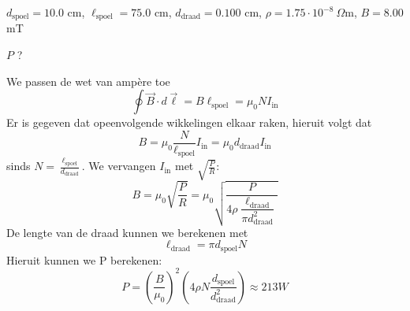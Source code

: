 \begin{description}[labelwidth=1.5cm, leftmargin=!]
    \item[Geg. :]   $d_{\text{spoel}} = 10.0$ cm, $\ell_{\text{spoel}} = 75.0$ cm, $d_{\text{draad}} = 0.100$ cm, $\rho = 1.75 \cdot 10^{-8} \ \Omega$m, $B = 8.00$ mT
    \item[Gevr. :]  $P$ ?
    \item[Opl. :]   
    
                    We passen de wet van ampère toe 
                    \begin{equation*}
                        \oint \Vec{B} \cdot d\Vec{\ell} = B\ell_{\text{spoel}} = \mu_0NI_{\text{in}}
                    \end{equation*}
                    Er is gegeven dat opeenvolgende wikkelingen elkaar raken, hieruit volgt dat 
                    \begin{equation*}
                        B = \mu_0\dfrac{N}{\ell_{\text{spoel}}}I_{\text{in}} = \mu_0d_{\text{draad}}I_{\text{in}} 
                    \end{equation*}
                    sinds $N = \tfrac{\ell_{\text{spoel}}}{d_{\text{draad}}}$. We vervangen $I_{\text{in}}$ met $\sqrt{\tfrac{P}{R}}$:
                    \begin{equation*}
                        B = \mu_0\sqrt{\dfrac{P}{R}} = \mu_0\sqrt{\dfrac{P}{4\rho\dfrac{\ell_{\text{draad}}}{\pi d_{\text{draad}}^2}}}
                    \end{equation*}
                    De lengte van de draad kunnen we berekenen met
                    \begin{equation*}
                        \ell_{\text{draad}} = \pi d_{\text{spoel}} N 
                    \end{equation*}
                    Hieruit kunnen we P berekenen: 
                    \begin{equation*}
                        P = \left(\dfrac{B}{\mu_0}\right)^2\left(4\rho N \dfrac{d_{\text{spoel}}}{
                        d_{\text{draad}}^2}\right) \approx 213 W
                    \end{equation*}           
\end{description}

\vspace{1cm}
